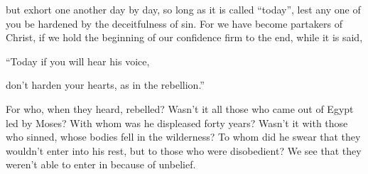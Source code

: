 {but exhort one another day by day, so long as it is called “today”, lest any one of you be hardened by the deceitfulness of sin.
For we have become partakers of Christ, if we hold the beginning of our confidence firm to the end,
while it is said,
\par }{\Q “Today if you will hear his voice,
\par }{\QB don’t harden your hearts, as in the rebellion.”
\par }{\PP {}For who, when they heard, rebelled? Wasn’t it all those who came out of Egypt led by Moses?
With whom was he displeased forty years? Wasn’t it with those who sinned, whose bodies fell in the wilderness?
To whom did he swear that they wouldn’t enter into his rest, but to those who were disobedient?
We see that they weren’t able to enter in because of unbelief.

}
